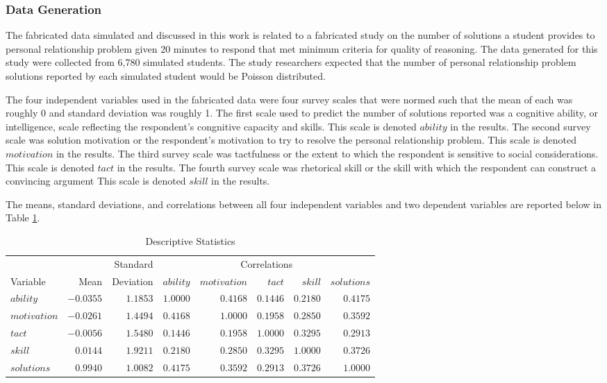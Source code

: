\documentclass[man]{apa7}
\begin{document}
		\subsubsection{Data Generation}
	
	The fabricated data simulated and discussed in this work is related to a fabricated study on the number of solutions a student provides to personal relationship problem given 20 minutes to respond that met minimum criteria for quality of reasoning.
	The data generated for this study were collected from 6,780 simulated students.
	The study researchers expected that the number of personal relationship problem solutions reported by each simulated student would be Poisson distributed.
	
	The four independent variables used in the fabricated data were four survey scales that were normed such that the mean of each was roughly 0 and standard deviation was roughly 1. 
	The first scale used to predict the number of solutions reported was a cognitive ability, or intelligence, scale reflecting the respondent's congnitive capacity and skills.
	This scale is denoted $ability$ in the results.
	The second survey scale was solution motivation or the respondent's motivation to try to resolve the personal relationship problem.
	This scale is denoted $motivation$ in the results.
	The third survey scale was tactfulness or the extent to which the respondent is sensitive to social considerations.	
	This scale is denoted $tact$ in the results.
	The fourth survey scale was rhetorical skill or the skill with which the respondent can construct a convincing argument
	This scale is denoted $skill$ in the results.
	
	The means, standard deviations, and correlations between all four independent variables and two dependent variables are reported below in Table \ref{tab:desc}. 
	
	\begin{table}[h!]
		\centering
		\caption{\centering Descriptive Statistics} 
		\begin{tabular}{lrr|rrrrr}
			\hline 
			&  & Standard & \multicolumn{5}{c}{Correlations} \\ 
			Variable & Mean & Deviation & $ability$ & $motivation$ & $tact$ & $skill$ & $solutions$ \\ 
			\hline
			$ability$ & $-0.0355$ & $1.1853$ & $1.0000$ & $0.4168$ & $0.1446$ & $0.2180$ & $0.4175$ \\ 
			$motivation$ & $-0.0261$ & $1.4494$ & $0.4168$ & $1.0000$ & $0.1958$ & $0.2850$ & $0.3592$ \\ 
			$tact$ & $-0.0056$ & $1.5480$ & $0.1446$ & $0.1958$ & $1.0000$ & $0.3295$ & $0.2913$ \\ 
			$skill$ & $0.0144$ & $1.9211$ & $0.2180$ & $0.2850$ & $0.3295$ & $1.0000$ & $0.3726$ \\ 
			$solutions$ & $0.9940$ & $1.0082$ & $0.4175$ & $0.3592$ & $0.2913$ & $0.3726$ & $1.0000$ \\ 
			\hline 
		\end{tabular}
		\label{tab:desc}
	\end{table}
	
\end{document}
